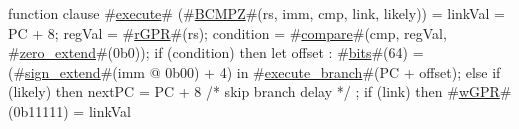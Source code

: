 function clause #\hyperref[zexecute]{execute}# (#\hyperref[zBCMPZ]{BCMPZ}#(rs, imm, cmp, link, likely)) =
  {
    linkVal = PC + 8;
    regVal = #\hyperref[zrGPR]{rGPR}#(rs);
    condition = #\hyperref[zcompare]{compare}#(cmp, regVal, #\hyperref[zzzerozyextend]{zero\_extend}#(0b0));
    if (condition) then
      {
        let offset : #\hyperref[zbits]{bits}#(64) = (#\hyperref[zsignzyextend]{sign\_extend}#(imm @ 0b00) + 4) in
        #\hyperref[zexecutezybranch]{execute\_branch}#(PC + offset);
      }
    else if (likely) then
      {
        nextPC = PC + 8  /* skip branch delay */
      };
    if (link) then
      #\hyperref[zwGPR]{wGPR}#(0b11111) = linkVal
  }
